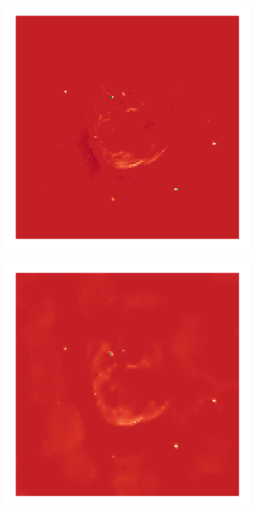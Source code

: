 \begin{figure}[h]
	\begin{subfigure}[b]{0.3\linewidth}
		\includegraphics[width=\linewidth, trim={18px 19px 18px 18px}, clip]{./chapters/05.results/g55/clean_model.png}
	\end{subfigure}
	\begin{subfigure}[b]{0.3\linewidth}
		\includegraphics[width=\linewidth, trim={18px 19px 18px 18px}, clip]{./chapters/05.results/g55/starlets1_model.png}

\end{subfigure}
\end{figure}
